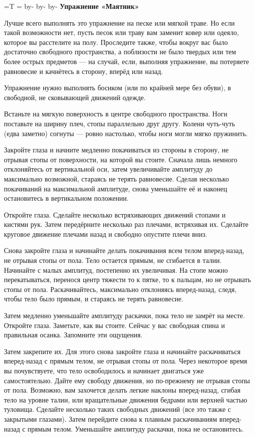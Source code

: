 \pdfhorigin=15mm \hsize=180mm
\pdfvorigin=15mm =\hbox{T} =\topskip \advance{} by-
  \advance\pdfvorigin by-
\vsize=282mm \advance\vsize by-\pdfvorigin
\nopagenumbers
{\bf Упражнение «Маятник»}

Лучше всего выполнять это упражнение на песке или мягкой траве. Но если такой возможности нет, пусть песок или траву вам заменит ковер или одеяло, которое вы расстелите на полу. Проследите также, чтобы вокруг вас было достаточно свободного пространства, а поблизости не было твердых или тем более острых предметов --- на случай, если, выполняя
упражнение, вы потеряете равновесие и качнётесь
в сторону, вперёд или назад.

Упражнение нужно выполнять босиком (или по крайней мере без обуви), в свободной, не сковывающей движений одежде.

Встаньте на мягкую поверхность в центре свободного пространства. Ноги поставьте на ширину плеч, стопы параллельно друг другу. Колени чуть-чуть (едва заметно) согнуты --- ровно настолько, чтобы ноги
могли мягко пружинить.

Закройте глаза и начните медленно покачиваться из стороны в сторону, не отрывая стопы от поверхности, на которой вы стоите. Сначала лишь немного отклоняйтесь от вертикальной оси, затем увеличивайте амплитуду до максимально возможной, стараясь не терять равновесие. Сделав несколько покачиваний на максимальной амплитуде, снова уменьшайте её и наконец остановитесь в вертикальном положении.

Откройте глаза. Сделайте несколько встряхивающих движений стопами и кистями рук. Затем передёрните несколько раз плечами, встряхивая их. Сделайте круговое движение плечами назад и свободно
опустите плечи вниз.

Снова закройте глаза и начинайте делать покачивания всем телом вперед-назад, не отрывая стопы от пола. Тело остается прямым, не сгибается в талии. Начинайте с малых амплитуд, постепенно их увеличивая. На стопе можно перекатываться, перенося центр тяжести то к пятке, то к пальцам, но не отрывать стопы от пола. Раскачивайтесь, максимально отклоняясь вперед-назад, следя, чтобы тело было
прямым, и стараясь не терять равновесие.

Затем медленно уменьшайте амплитуду раскачки, пока тело не замрёт на месте. Откройте глаза. Заметьте, как вы стоите. Сейчас у вас свободная спина и правильная осанка. Запомните эти ощущения.

Затем закрепите их. Для этого снова закройте глаза и начинайте раскачиваться вперед-назад с прямым телом, не отрывая стопы от пола. Через некоторое время вы почувствуете, что тело освободилось и начинает двигаться уже самостоятельно. Дайте ему свободу движения, но по-прежнему не отрывая стопы от пола. Возможно, вам захочется делать легкие наклоны вперед-назад, сгибая тело на уровне талии, или вращательные движения бедрами или верхней частью туловища. Сделайте несколько таких свободных движений (все это также с закрытыми глазами). Затем перейдите снова к плавным раскачиваниям вперед-назад с прямым телом. Уменьшайте амплитуду раскачки, пока не остановитесь.


